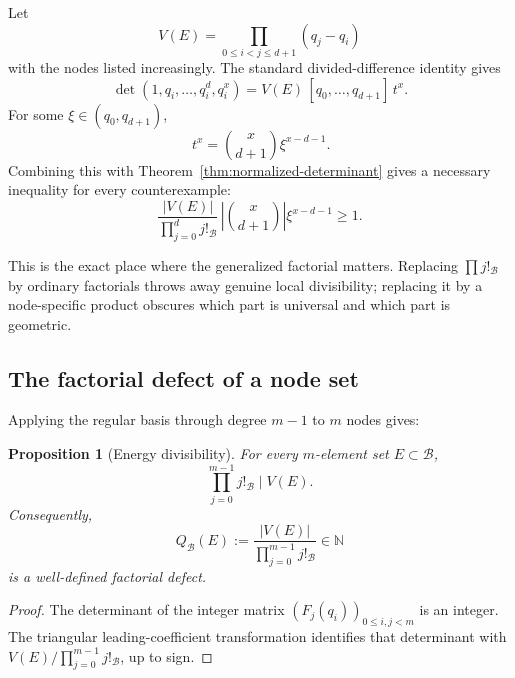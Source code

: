 \documentclass[11pt,oneside]{article}
\newtheorem{proposition}[theorem]{Proposition}
\theoremstyle{definition}
\theoremstyle{remark}
\newcommand{\N}{\mathbb N}
\newcommand{\B}{\mathcal B}
\begin{document}
Let
\[
 V(E)=\prod_{0\le i<j\le d+1}(q_j-q_i)
\]
with the nodes listed increasingly.  The standard divided-difference identity gives
\begin{equation}
 \det(1,q_i,\ldots,q_i^d,q_i^x)
 =
 V(E)\,[q_0,\ldots,q_{d+1}]\,t^x.
 \label{eq:divided-difference-det}
\end{equation}
For some \(\xi\in(q_0,q_{d+1})\),
\begin{equation}
 [q_0,\ldots,q_{d+1}]\,t^x
 =
 \binom{x}{d+1}\xi^{x-d-1}.
 \label{eq:mean-value-divdiff}
\end{equation}
Combining this with Theorem~\ref{thm:normalized-determinant} gives a necessary inequality
for every counterexample:
\begin{equation}
 \boxed{
 \frac{|V(E)|}{\prod_{j=0}^{d}j!_{\B}}\,
 \left|\binom{x}{d+1}\right|
 \xi^{x-d-1}
 \ge1.}
 \label{eq:master-arch-ineq}
\end{equation}

This is the exact place where the generalized factorial matters.  Replacing
\(\prod j!_{\B}\) by ordinary factorials throws away genuine local divisibility; replacing it
by a node-specific product obscures which part is universal and which part is geometric.

\subsection{The factorial defect of a node set}

Applying the regular basis through degree \(m-1\) to \(m\) nodes gives:

\begin{proposition}[Energy divisibility]
\label{prop:energy-divisibility}
For every \(m\)-element set \(E\subset\B\),
\begin{equation}
  \prod_{j=0}^{m-1}j!_{\B}\mid V(E).
  \label{eq:energy-divisibility}
\end{equation}
Consequently,
\begin{equation}
  Q_{\B}(E):=
  \frac{|V(E)|}{\prod_{j=0}^{m-1}j!_{\B}}
  \in\N
  \label{eq:defect-Q}
\end{equation}
is a well-defined factorial defect.
\end{proposition}

\begin{proof}
The determinant of the integer matrix \((F_j(q_i))_{0\le i,j<m}\) is an integer.  The
triangular leading-coefficient transformation identifies that determinant with
\(V(E)/\prod_{j=0}^{m-1}j!_{\B}\), up to sign.
\end{proof}
\end{document}

